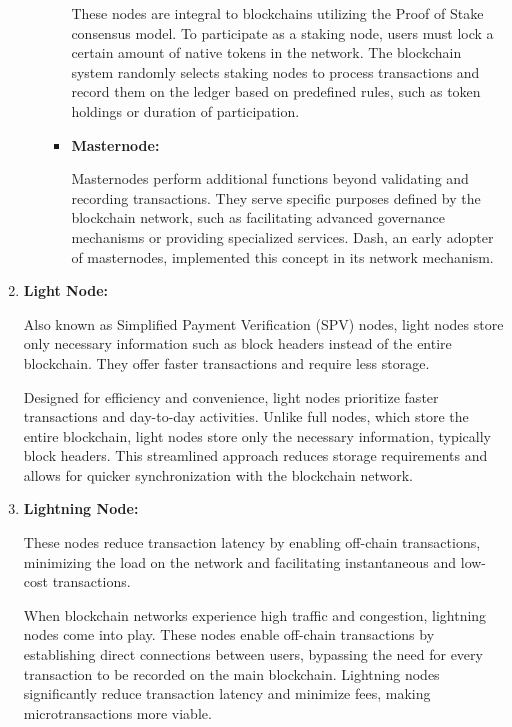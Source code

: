 \begin{enumerate}
\begin{itemize}
\begin{itemize}
    These nodes are integral to blockchains utilizing the Proof of Stake consensus model. To participate as a staking node, users must lock a certain amount of native tokens in the network. The blockchain system randomly selects staking nodes to process transactions and record them on the ledger based on predefined rules, such as token holdings or duration of participation.\newline
    \item \textbf{Masternode:}

    Masternodes perform additional functions beyond validating and recording transactions. They serve specific purposes defined by the blockchain network, such as facilitating advanced governance mechanisms or providing specialized services. Dash, an early adopter of masternodes, implemented this concept in its network mechanism.\newline
    
\end{itemize}
    \end{itemize}
    
    \item \textbf{Light Node:}

    Also known as Simplified Payment Verification (SPV) nodes, light nodes store only necessary information such as block headers instead of the entire blockchain. They offer faster transactions and require less storage.

    Designed for efficiency and convenience, light nodes prioritize faster transactions and day-to-day activities. Unlike full nodes, which store the entire blockchain, light nodes store only the necessary information, typically block headers. This streamlined approach reduces storage requirements and allows for quicker synchronization with the blockchain network.\newline
    
    \item \textbf{Lightning Node:}

    These nodes reduce transaction latency by enabling off-chain transactions, minimizing the load on the network and facilitating instantaneous and low-cost transactions.

    When blockchain networks experience high traffic and congestion, lightning nodes come into play. These nodes enable off-chain transactions by establishing direct connections between users, bypassing the need for every transaction to be recorded on the main blockchain. Lightning nodes significantly reduce transaction latency and minimize fees, making microtransactions more viable.\newline
    

\end{enumerate}
